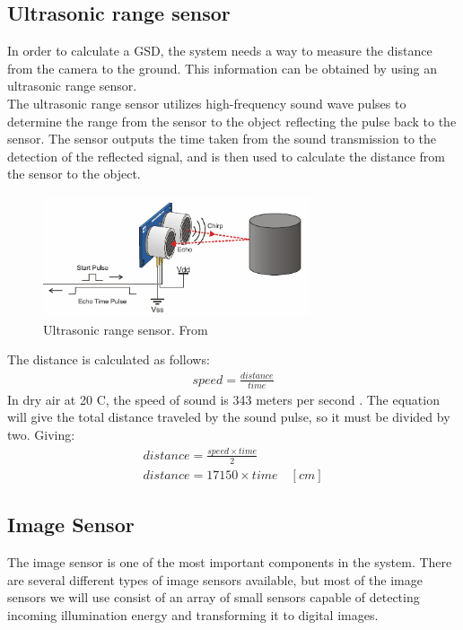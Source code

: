 \subsection{Ultrasonic range sensor}
In order to calculate a GSD, the system needs a way to measure the distance from the camera to the ground. This information can be obtained by using an ultrasonic range sensor. \\

The ultrasonic range sensor utilizes high-frequency sound wave pulses to determine the range from the sensor to the object reflecting the pulse back to the sensor. The sensor outputs the time taken from the sound transmission to the detection of the reflected signal, and is then used to calculate the distance from the sensor to the object.\\

\begin{figure}[h]
  \centering
  \includegraphics[width=0.7\textwidth]{fig/dsensor}
  \caption{Ultrasonic range sensor. From \cite{maker}}
  \label{fig:dsensor}
\end{figure}

The distance is calculated as follows:
\begin{align}
	speed = \frac{distance}{time}
\end{align}
In dry air at 20 C, the speed of sound is 343 meters per second \cite{sos}. The equation will give the total distance traveled by the sound pulse, so it must be divided by two. Giving:
\begin{align*}
	distance = \frac{speed \times time}{2}\\
    distance = 17150 \times time \quad [cm] 
\end{align*}

\newpage

\subsection{Image Sensor}
The image sensor is one of the most important components in the system. There are several different types of image sensors available, but most of the image sensors we will use consist of an array of small sensors capable of detecting incoming illumination energy and transforming it to digital images.\\

